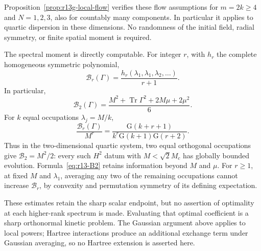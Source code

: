 Proposition~\ref{prop:r13g-local-flow} verifies these flow assumptions
for $m=2k\ge4$ and $N=1,2,3$, also for countably many components.
In particular it applies to quartic dispersion in these dimensions.
No randomness of the initial field,
radial symmetry, or finite spatial moment is required.

The spectral moment is directly computable. For integer $r$, with
$h_r$ the complete homogeneous symmetric polynomial,
\[
 \mathcal B_r(\Gamma)
 =\frac{h_r(\lambda_1,\lambda_1,\lambda_2,\ldots)}{r+1}.
\]
In particular,
\begin{equation}\label{eq:r13-B2}
 \mathcal B_2(\Gamma)=
 \frac{M^2+\operatorname{Tr}\Gamma^2+2M\mu+2\mu^2}{6}.
\end{equation}
For $k$ equal occupations $\lambda_j=M/k$,
\[
 \frac{\mathcal B_r(\Gamma)}{M^r}
 =\frac{\mathrm G(k+r+1)}
 {k^r\mathrm G(k+1)\mathrm G(r+2)}.
\]
Thus in the two-dimensional quartic system, two equal orthogonal
occupations give $\mathcal B_2=M^2/2$: every such $H^2$ datum with
$M<\sqrt2M_c$ has globally bounded evolution.
Formula~\eqref{eq:r13-B2} retains information beyond $M$ and $\mu$.
For $r\ge1$, at fixed $M$ and $\lambda_1$, averaging any two of the
remaining occupations cannot increase $\mathcal B_r$, by convexity
and permutation symmetry of its defining expectation.

These estimates retain the sharp scalar endpoint, but no assertion
of optimality at each higher-rank spectrum is made. Evaluating that
optimal coefficient is a sharp orthonormal kinetic problem. The
Gaussian argument above applies to local powers; Hartree interactions
produce an additional exchange term under Gaussian averaging, so no
Hartree extension is asserted here.
